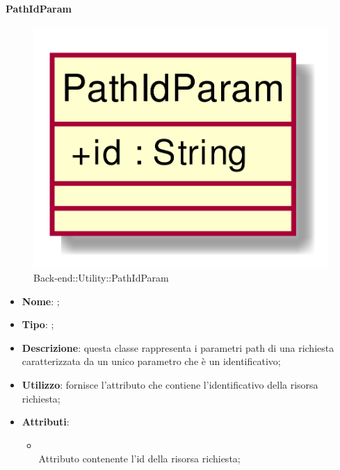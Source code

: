 \hypertarget{PathIdParam_label}{\paragraph{PathIdParam}}
\begin{figure}[h]
	\centering
	\includegraphics[width=\textwidth,height=\textheight,keepaspectratio]{images/ClassPathIdParam.png}
	\caption{Back-end::Utility::PathIdParam}
\end{figure}
\begin{itemize}
	\item \textbf{Nome}: ;
	\item \textbf{Tipo}: ;
	\item \textbf{Descrizione}: questa classe rappresenta i parametri path di una richiesta caratterizzata da un unico parametro che è un identificativo;
	\item \textbf{Utilizzo}: fornisce l'attributo che contiene l'identificativo della risorsa richiesta;
	\item \textbf{Attributi}:
	\begin{itemize}
		\item[]  \\
		Attributo contenente l'id della risorsa richiesta;
	\end{itemize}
\end{itemize}

